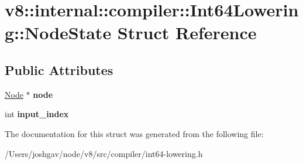 \hypertarget{structv8_1_1internal_1_1compiler_1_1_int64_lowering_1_1_node_state}{}\section{v8\+:\+:internal\+:\+:compiler\+:\+:Int64\+Lowering\+:\+:Node\+State Struct Reference}
\label{structv8_1_1internal_1_1compiler_1_1_int64_lowering_1_1_node_state}
\subsection*{Public Attributes}
\begin{DoxyCompactItemize}
\item 
\hyperlink{classv8_1_1internal_1_1compiler_1_1_node}{Node} $\ast$ {\bfseries node}\hypertarget{structv8_1_1internal_1_1compiler_1_1_int64_lowering_1_1_node_state_af0fca1ffcbc2dd9e0dbba1a15f2ae9dc}{}\label{structv8_1_1internal_1_1compiler_1_1_int64_lowering_1_1_node_state_af0fca1ffcbc2dd9e0dbba1a15f2ae9dc}

\item 
int {\bfseries input\+\_\+index}\hypertarget{structv8_1_1internal_1_1compiler_1_1_int64_lowering_1_1_node_state_afa6a51640650de7979b27355edee25fc}{}\label{structv8_1_1internal_1_1compiler_1_1_int64_lowering_1_1_node_state_afa6a51640650de7979b27355edee25fc}

\end{DoxyCompactItemize}


The documentation for this struct was generated from the following file\+:\begin{DoxyCompactItemize}
\item 
/\+Users/joshgav/node/v8/src/compiler/int64-\/lowering.\+h\end{DoxyCompactItemize}
